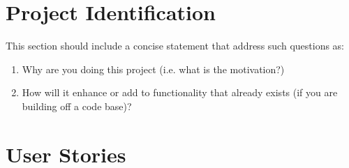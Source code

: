 \documentclass[12pt]{article}
\begin{document}
\section{Project Identification}
This section should include a concise statement that address such questions as:
\begin{enumerate}
    \item Why are you doing this project (i.e. what is the motivation?)
    \item How will it enhance or add to functionality that already exists (if you are building off a code base)?
\end{enumerate}

\section{User Stories}
\end{document}
